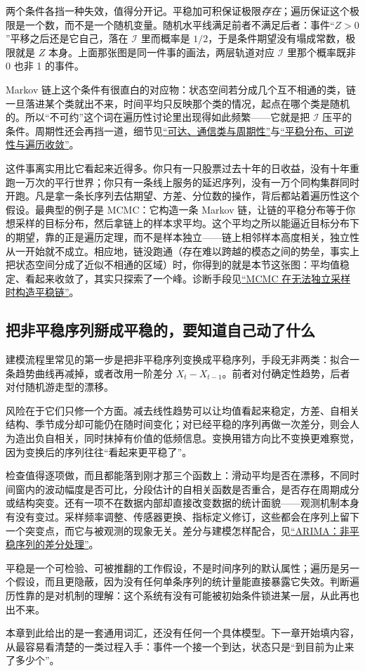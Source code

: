 两个条件各挡一种失效，值得分开记。平稳加可积保证极限\emph{存在}；遍历保证这个极限是一个数，而不是一个随机变量。随机水平线满足前者不满足后者：事件``\(Z>0\)''平移之后还是它自己，落在 \(\mathcal I\) 里而概率是 \(1/2\)，于是条件期望没有塌成常数，极限就是 \(Z\) 本身。上面那张图是同一件事的画法，两层轨道对应 \(\mathcal I\) 里那个概率既非 0 也非 1 的事件。

Markov 链上这个条件有很直白的对应物：状态空间若分成几个互不相通的类，链一旦落进某个类就出不来，时间平均只反映那个类的情况，起点在哪个类是随机的。所以``不可约''这个词在遍历性讨论里出现得如此频繁——它就是把 \(\mathcal I\) 压平的条件。周期性还会再挡一道，细节见\hyperref[sec:06-Random-Processes/03-Markov-Chains/02]{``可达、通信类与周期性''}与\hyperref[sec:06-Random-Processes/03-Markov-Chains/04]{``平稳分布、可逆性与遍历收敛''}。

这件事离实用比它看起来近得多。你只有一只股票过去十年的日收益，没有十年重跑一万次的平行世界；你只有一条线上服务的延迟序列，没有一万个同构集群同时开跑。凡是拿一条长序列去估期望、方差、分位数的操作，背后都站着遍历性这个假设。最典型的例子是 MCMC：它构造一条 Markov 链，让链的平稳分布等于你想采样的目标分布，然后拿链上的样本求平均。这个平均之所以能逼近目标分布下的期望，靠的正是遍历定理，而不是样本独立——链上相邻样本高度相关，独立性从一开始就不成立。相应地，链没跑通（存在难以跨越的模态之间的势垒，事实上把状态空间分成了近似不相通的区域）时，你得到的就是本节这张图：平均值稳定、看起来收敛了，其实只探索了一个峰。诊断手段见\hyperref[sec:13-Machine-Learning/08-Sampling-and-Inference/02]{``MCMC 在无法独立采样时构造平稳链''}。

\subsection{把非平稳序列掰成平稳的，要知道自己动了什么}

建模流程里常见的第一步是把非平稳序列变换成平稳序列，手段无非两类：拟合一条趋势曲线再减掉，或者改用一阶差分 \(X_t - X_{t-1}\)。前者对付确定性趋势，后者对付随机游走型的漂移。

风险在于它们只修一个方面。减去线性趋势可以让均值看起来稳定，方差、自相关结构、季节成分却可能仍在随时间变化；对已经平稳的序列再做一次差分，则会人为造出负自相关，同时抹掉有价值的低频信息。变换用错方向比不变换更难察觉，因为变换后的序列往往``看起来更平稳了''。

检查值得逐项做，而且都能落到刚才那三个函数上：滑动平均是否在漂移，不同时间窗内的波动幅度是否可比，分段估计的自相关函数是否重合，是否存在周期成分或结构突变。还有一项不在数据内部却直接改变数据的统计面貌——观测机制本身有没有变过。采样频率调整、传感器更换、指标定义修订，这些都会在序列上留下一个突变点，而它与被观测的现象无关。差分与建模怎样配合，见\hyperref[sec:06-Random-Processes/06-ARMA-and-ARIMA/03]{``ARIMA：非平稳序列的差分处理''}。

平稳是一个可检验、可被推翻的工作假设，不是时间序列的默认属性；遍历是另一个假设，而且更隐蔽，因为没有任何单条序列的统计量能直接暴露它失效。判断遍历性靠的是对机制的理解：这个系统有没有可能被初始条件锁进某一层，从此再也出不来。

本章到此给出的是一套通用词汇，还没有任何一个具体模型。下一章开始填内容，从最容易看清楚的一类过程入手：事件一个接一个到达，状态只是``到目前为止来了多少个''。
